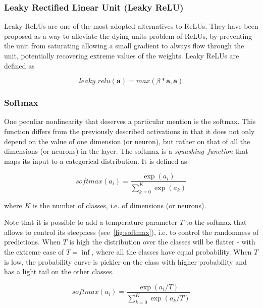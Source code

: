 \subsubsection{Leaky Rectified Linear Unit (Leaky ReLU)}\label{sec:lrelu}
Leaky ReLUs are one of the most adopted alternatives to ReLUs. They have been
proposed as a way to alleviate the dying units problem of ReLUs, by preventing
the unit from saturating allowing a small gradient to always flow through the
unit, potentially recovering extreme values of the weights. Leaky ReLUs are
defined as

\begin{equation}\label{eq:lrelu}
    leaky\_relu(\mathbf{a}) = max(\beta*\mathbf{a}, \mathbf{a})
\end{equation}

\subsubsection{Softmax}\label{sec:softmax}
One peculiar nonlinearity that deserves a particular mention is the softmax.
This function differs from the previously described activations in that it
does not only depend on the value of one dimension (or neuron), but rather on
that of all the dimensions (or neurons) in the layer. The softmax is a
\emph{squashing~function} that maps its input to a categorical distribution.
It is defined as

\begin{equation}\label{eq:softmax}
    softmax(a_i) = \frac{\exp(a_i)}{\sum_{k=0}^K{\exp(a_k)}}
\end{equation}

\noindent where $K$ is the number of classes, i.e. of dimensions (or neurons).

Note that it is possible to add a temperature parameter $T$ to the softmax that
allows to control its steepness (see~\autoref{fig:softmax}), i.e. to control
the randomness of predictions. When $T$ is high the distribution over the
classes will be flatter - with the extreme case of $T = \inf$, where all the
classes have equal probability. When $T$ is low, the probability curve is
pickier on the class with higher probability and has a light tail on the other
classes.

\begin{equation}\label{eq:softmax_tmp}
    softmax(a_i) = \frac{\exp(a_i / T)}
                        {\sum_{k=0}^K{\exp(a_k / T)}}
\end{equation}

